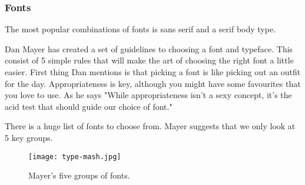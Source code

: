 \subsubsection{Fonts}
The most popular combinations of fonts is sans serif and a serif body type. \cite{TypeComb}

Dan Mayer has created a set of guidelines to choosing a font and typeface. This consist of 5 simple rules that will make the art of choosing the right font a little easier. First thing Dan mentions is that picking a font is like picking out an outfit for the day. Appropriateness is key, although you might have some favourites that you love to use. As he says "While appropriateness isn't a sexy concept, it's the acid test that should guide our choice of font." \cite{Font}

There is a huge list of fonts to choose from. Mayer suggests that we only look at 5 key groups. 

\begin{figure}[H]
\centering
\texttt{[image: type-mash.jpg]}
\caption{Mayer's five groups of fonts. \cite{Font}}
\end{figure}

